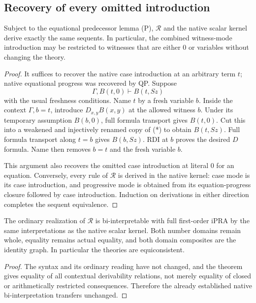 \subsection{Recovery of every omitted introduction}

\begin{theorem}
Subject to the equational predecessor lemma (P), $\mathcal R$ and the
native scalar kernel derive exactly the same sequents.  In particular,
the combined witness-mode introduction may be restricted to witnesses
that are either $0$ or variables without changing the theory.
\end{theorem}
\begin{proof}
It suffices to recover the native case introduction at an arbitrary term
$t$; native equational progress was recovered by QP.  Suppose
\[
 \Gamma,B(t,0)\vdash B(t,Sz)
 \tag{*}
\]
with the usual freshness conditions.  Name $t$ by a fresh variable $b$.
Inside the context $\Gamma,b=t$, introduce $D_{x,y}B(x,y)$ at the
allowed witness $b$.  Under its temporary assumption $B(b,0)$, full
formula transport gives $B(t,0)$.  Cut this into a weakened and
injectively renamed copy of (*) to obtain $B(t,Sz)$.  Full formula
transport along $t=b$ gives $B(b,Sz)$.  RDI at $b$ proves the desired
$D$ formula.  Name then removes $b=t$ and the fresh variable $b$.

This argument also recovers the omitted case introduction at literal
$0$ for an equation.  Conversely, every rule of $\mathcal R$ is
derived in the native kernel: case mode is its case introduction,
and progressive mode is obtained from its equation-progress closure
followed by case introduction.  Induction on derivations in either
direction completes the sequent equivalence.
\end{proof}

\begin{corollary}
The ordinary realization of $\mathcal R$ is bi-interpretable with full
first-order iPRA by the same interpretations as the native scalar
kernel.  Both number domains remain whole, equality remains actual
equality, and both domain composites are the identity graph.  In
particular the theories are equiconsistent.
\end{corollary}
\begin{proof}
The syntax and its ordinary reading have not changed, and the theorem
gives equality of all contextual derivability relations, not merely
equality of closed or arithmetically restricted consequences.  Therefore
the already established native bi-interpretation transfers unchanged.
\end{proof}

